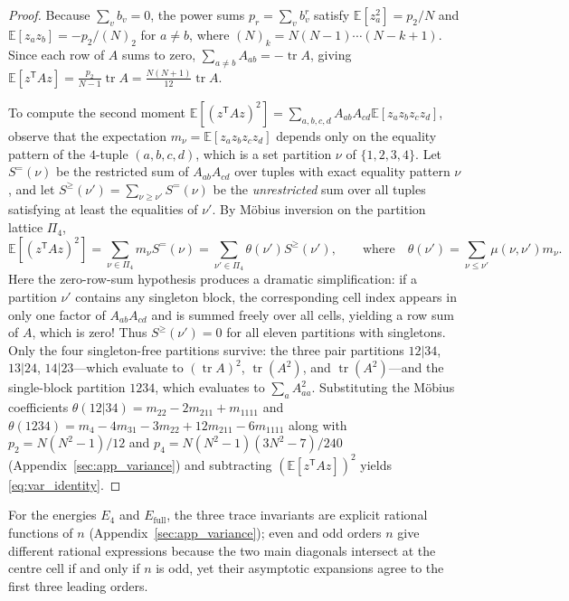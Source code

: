 \documentclass[11pt,a4paper]{article}
\theoremstyle{plain}
\theoremstyle{definition}
\theoremstyle{remark}
\newcommand{\Efull}{E_{\mathrm{full}}}
\newcommand{\Efour}{E_4}
\newcommand{\E}{\mathbb{E}}
\newcommand{\tr}{\operatorname{tr}}
\begin{document}
\begin{proof}
Because $\sum_vb_v=0$, the power sums $p_r=\sum_vb_v^r$ satisfy $\E[z_a^2]=p_2/N$ and $\E[z_az_b]=-p_2/(N)_2$ for $a\ne b$, where $(N)_k=N(N-1)\cdots(N-k+1)$. Since each row of $A$ sums to zero, $\sum_{a\ne b}A_{ab}=-\tr A$, giving $\E[z^{\mathsf T}Az]=\frac{p_2}{N-1}\tr A=\frac{N(N+1)}{12}\tr A$.

To compute the second moment $\E[(z^{\mathsf T}Az)^2]=\sum_{a,b,c,d}A_{ab}A_{cd}\E[z_az_bz_cz_d]$, observe that the expectation $m_\nu=\E[z_az_bz_cz_d]$ depends only on the equality pattern of the $4$-tuple $(a,b,c,d)$, which is a set partition $\nu$ of $\{1,2,3,4\}$. Let $S^=(\nu)$ be the restricted sum of $A_{ab}A_{cd}$ over tuples with exact equality pattern $\nu$, and let $S^\ge(\nu')=\sum_{\nu\ge\nu'}S^=(\nu)$ be the \emph{unrestricted} sum over all tuples satisfying at least the equalities of $\nu'$. By M\"obius inversion on the partition lattice $\Pi_4$,
\[
\E[(z^{\mathsf T}Az)^2]=\sum_{\nu\in\Pi_4}m_\nu S^=(\nu)=\sum_{\nu'\in\Pi_4}\theta(\nu')S^\ge(\nu'),\qquad\text{where}\quad \theta(\nu')=\sum_{\nu\le\nu'}\mu(\nu,\nu')m_\nu.
\]
Here the zero-row-sum hypothesis produces a dramatic simplification: if a partition $\nu'$ contains any singleton block, the corresponding cell index appears in only one factor of $A_{ab}A_{cd}$ and is summed freely over all cells, yielding a row sum of $A$, which is zero! Thus $S^\ge(\nu')=0$ for all eleven partitions with singletons. Only the four singleton-free partitions survive: the three pair partitions $12|34$, $13|24$, $14|23$—which evaluate to $(\tr A)^2$, $\tr(A^2)$, and $\tr(A^2)$—and the single-block partition $1234$, which evaluates to $\sum_a A_{aa}^2$. Substituting the M\"obius coefficients $\theta(12|34)=m_{22}-2m_{211}+m_{1111}$ and $\theta(1234)=m_4-4m_{31}-3m_{22}+12m_{211}-6m_{1111}$ along with $p_2=N(N^2-1)/12$ and $p_4=N(N^2-1)(3N^2-7)/240$ (Appendix~\ref{sec:app_variance}) and subtracting $(\E[z^{\mathsf T}Az])^2$ yields \eqref{eq:var_identity}.
\end{proof}

For the energies $\Efour$ and $\Efull$, the three trace invariants are explicit rational functions of $n$ (Appendix~\ref{sec:app_variance}); even and odd orders $n$ give different rational expressions because the two main diagonals intersect at the centre cell if and only if $n$ is odd, yet their asymptotic expansions agree to the first three leading orders.
\end{document}
